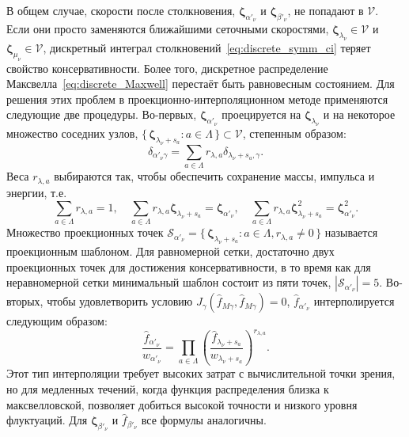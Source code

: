 \documentclass[
aps,%
12pt,%
final,%
notitlepage,%
oneside,%
onecolumn,%
nobibnotes,%
nofootinbib,%
superscriptaddress,%
noshowpacs,%
centertags]%
{revtex4}
\newcommand{\bzeta}{\boldsymbol{\zeta}}
\newcommand{\Set}[2]{\{\,{#1}:{#2}\,\}}
\begin{document}
В общем случае, скорости после столкновения,
\(\bzeta_{\alpha'_\nu}\) и \(\bzeta_{\beta'_\nu}\), не попадают в \(\mathcal{V}\).
Если они просто заменяются ближайшими сеточными скоростями,
\(\bzeta_{\lambda_\nu}\in\mathcal{V}\) и \(\bzeta_{\mu_\nu}\in\mathcal{V}\),
дискретный интеграл столкновений~\eqref{eq:discrete_symm_ci} теряет свойство консервативности.
Более того, дискретное распределение Максвелла~\eqref{eq:discrete_Maxwell} перестаёт быть равновесным состоянием.
Для решения этих проблем в проекционно-интерполяционном методе применяются следующие две процедуры.
Во-первых, \(\bzeta_{\alpha'_\nu}\) проецируется на \(\bzeta_{\lambda_\nu}\) и
на некоторое множество соседних узлов, \(\Set{\bzeta_{\lambda_\nu+s_a}}{a\in\Lambda}\subset\mathcal{V}\),
степенным образом:
\begin{equation}\label{eq:ci_projection}
    \delta_{\alpha'_\nu\gamma} = \sum_{a\in\Lambda} r_{\lambda,a}\delta_{\lambda_\nu+s_a,\gamma}.
\end{equation}
Веса \(r_{\lambda,a}\) выбираются так, чтобы обеспечить сохранение массы, импульса и энергии, т.е.
\begin{equation}\label{eq:impact_conservation}
    \sum_{a\in\Lambda} r_{\lambda,a} = 1, \quad
    \sum_{a\in\Lambda} r_{\lambda,a} \bzeta_{\lambda_\nu+s_a} = \bzeta_{\alpha'_\nu}, \quad
    \sum_{a\in\Lambda} r_{\lambda,a} \bzeta_{\lambda_\nu+s_a}^2 = \bzeta_{\alpha'_\nu}^2.
\end{equation}
Множество проекционных точек \(\mathcal{S}_{\alpha'_\nu} = \Set{\bzeta_{\lambda_\nu+s_a}}{a\in\Lambda, r_{\lambda,a}\neq0}\)
называется проекционным шаблоном.
Для равномерной сетки, достаточно двух проекционных точек для достижения консервативности,
в то время как для неравномерной сетки минимальный шаблон состоит из пяти точек, \(|\mathcal{S}_{\alpha'_\nu}|=5\).
Во-вторых, чтобы удовлетворить условию \(J_\gamma(\hat{f}_{M\gamma}, \hat{f}_{M\gamma}) = 0\),
\(\hat{f}_{\alpha'_\nu}\) интерполируется следующим образом:
\begin{equation}\label{eq:ci_interpolation}
    \frac{\hat{f}_{\alpha'_\nu}}{w_{\alpha'_\nu}} = \prod_{a\in\Lambda}
        \left(\frac{\hat{f}_{\lambda_\nu+s_a}}{w_{\lambda_\nu+s_a}} \right)^{r_{\lambda,a}}.
\end{equation}
Этот тип интерполяции требует высоких затрат с вычислительной точки зрения,
но для медленных течений, когда функция распределения близка к максвелловской,
позволяет добиться высокой точности и низкого уровня флуктуаций.
Для \(\bzeta_{\beta'_\nu}\) и \(\hat{f}_{\beta'_\nu}\) все формулы аналогичны.
\end{document}

